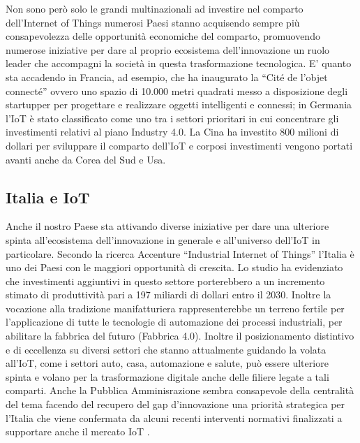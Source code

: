 \documentclass[a4paper]{report} %
\begin{document}
Non sono però solo le grandi multinazionali ad investire nel comparto dell’Internet of Things numerosi Paesi stanno acquisendo sempre più consapevolezza delle opportunità economiche del comparto, promuovendo numerose iniziative per dare al proprio ecosistema dell’innovazione un ruolo leader che accompagni la società in questa trasformazione tecnologica. E’ quanto sta accadendo in Francia, ad esempio, che ha inaugurato la “Cité de l’objet connecté” ovvero uno spazio di 10.000 metri quadrati messo a disposizione degli startupper per progettare e realizzare oggetti intelligenti e connessi; in Germania l’IoT è stato  classificato come uno tra i settori prioritari in cui concentrare gli investimenti relativi al piano Industry 4.0. La Cina ha investito 800 milioni di dollari per sviluppare il comparto dell’IoT e corposi investimenti vengono portati avanti anche da Corea del Sud e Usa\cite{art:rif.22}. 
\subsection{Italia e IoT} 
Anche il nostro Paese sta attivando diverse iniziative per dare una ulteriore spinta all’ecosistema dell’innovazione in generale e all’universo dell’IoT in particolare. Secondo la ricerca Accenture “Industrial Internet of Things” l’Italia è uno dei Paesi con le maggiori opportunità di crescita. Lo studio ha evidenziato che investimenti aggiuntivi in questo settore porterebbero a un incremento stimato di produttività  pari a 197 miliardi di dollari entro il 2030.
Inoltre la vocazione alla tradizione manifatturiera rappresenterebbe un terreno fertile per l’applicazione di tutte le tecnologie di automazione dei processi industriali, per abilitare la fabbrica del futuro (Fabbrica 4.0). Inoltre il posizionamento distintivo e di eccellenza su diversi settori che stanno attualmente guidando la volata all’IoT, come i settori auto, casa, automazione e salute, può essere ulteriore spinta e volano per la trasformazione digitale anche delle filiere legate a tali comparti.
Anche la Pubblica Amminisrazione sembra consapevole della centralità del tema facendo del recupero del gap d’innovazione una priorità strategica per l’Italia che viene confermata da alcuni recenti interventi normativi finalizzati a supportare anche il mercato IoT \cite{art:rif.22}.
\end{document}
